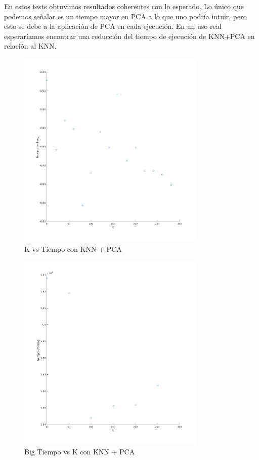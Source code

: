 En estos tests obtuvimos resultados coherentes con lo esperado.
Lo único que podemos señalar es un tiempo mayor en PCA a lo que uno podría intuir, pero esto se debe a la aplicación de PCA en cada ejecución. En un uso real esperaríamos encontrar una reducción del tiempo de ejecución de KNN+PCA en relación al KNN.

\begin{figure}[H]
	\centering	\includegraphics[width=0.8\textwidth]{img/k_pca_tiempo.png}
	\caption{K vs Tiempo con KNN + PCA}
	\label{fig:K vs Tiempo con KNN + PCA}
\end{figure}
\begin{figure}[H]
	\centering	\includegraphics[width=0.8\textwidth]{img/big_k_pca_tiempo.png}
	\caption{Big Tiempo vs K con KNN + PCA}
	\label{fig:Big K vs Tiempo con KNN + PCA}
\end{figure}


